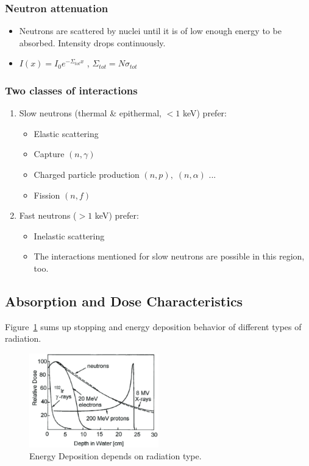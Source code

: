 \subsubsection{Neutron attenuation}
\begin{itemize}
    \item Neutrons are scattered by nuclei until it is of low enough energy to be absorbed. Intensity drops continuously.
    \item $I(x)=I_0e^{-\Sigma_{tot}x}$ , $\Sigma_{tot}=N\sigma_{tot}$
\end{itemize}
\subsubsection{Two classes of interactions}
\begin{enumerate}
    \item Slow neutrons (thermal \& epithermal, $<1$ keV) prefer:
    \begin{itemize}
        \item Elastic scattering
        \item Capture $(n,\gamma)$
        \item Charged particle production $(n,p),\;(n,\alpha)$ ...
        \item Fission $(n,f)$
    \end{itemize}
    \item Fast neutrons ($>1$ keV) prefer:
    \begin{itemize}
        \item Inelastic scattering
        \item The interactions mentioned for slow neutrons are possible in this region, too.
    \end{itemize}
\end{enumerate}
\subsection{Absorption and Dose Characteristics}
Figure~\ref{fig:dose_of_diff_radiation} sums up stopping and energy deposition behavior of different types of radiation. 
\begin{figure}[ht]
    \centering
    \includegraphics[width=0.5\textwidth]{images/dose_of_diff_radiation.png}
    \caption{Energy Deposition depends on radiation type.}
    \label{fig:dose_of_diff_radiation}
\end{figure}
